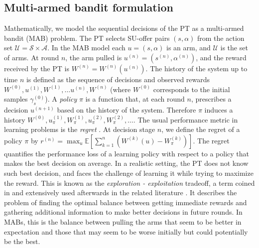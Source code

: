 \subsection {Multi-armed bandit formulation}
Mathematically, we model the sequential decisions of the PT as a multi-armed bandit (MAB) problem.
The PT selects SU-offer pairs $(s,\alpha)$ from the action set $\mathcal{U}=\mathcal{S}\times\mathcal{A}$.
In the MAB model each $u = (s,\alpha)$ is an arm, and $\mathcal{U}$ is the set of arms.
At round $n$, the arm pulled is $u^{(n)} = (s^{(n)},\alpha^{(n)})$, and the reward received by the PT is $W^{(n)} = W^{(n)}(u^{(n)})$.
The history of the system up to time $n$ is defined as the sequence of decisions and observed rewards $W^{(0)},u^{(1)}, W^{(1)},\ldots u^{(n)}, W^{(n)}$ (where $W^{(0)}$ corresponds to the initial samples $\gamma_s^{(0)}$).
A \textit{policy} $\pi$ is a function that, at each round $n$, prescribes a decision $u^{(n+1)}$ based on the history of the system. Therefore $\pi$ induces a history $W^{(0)},u_\pi^{(1)},W_\pi^{(1)},u_\pi^{(2)},W_\pi^{(2)},\ldots$. 
The usual performance metric in learning problems is the \textit{regret} \cite{ref:Bubeck2012}. 
At decision stage $n$, we define the regret of a policy $\pi$ by $r^{(n)} = \max_{u}\mathbb{E}\left[\sum_{k=1}^{n}\left(W^{(k)}(u) - W^{(k)}_{\pi}\right)\right]$.
The regret quantifies the performance loss of a learning policy with respect to a policy that makes the best decision on average.
In a realistic setting, the PT does not know such best decision, and faces the challenge of learning it while trying to maximize the reward. 
This is known as the \textit{exploration - exploitation} tradeoff, a term coined in \cite{ref:Gittins1974} and extensively used afterwards in the related literature \cite{ref:Sutton1998,ref:Powell2012}. It describes the problem of finding the optimal balance between getting immediate rewards and gathering additional information to make better decisions in future rounds. In MABs, this is the balance between pulling the arms that seem to be better in expectation and those that may seem to be worse initially but could potentially be the best.

